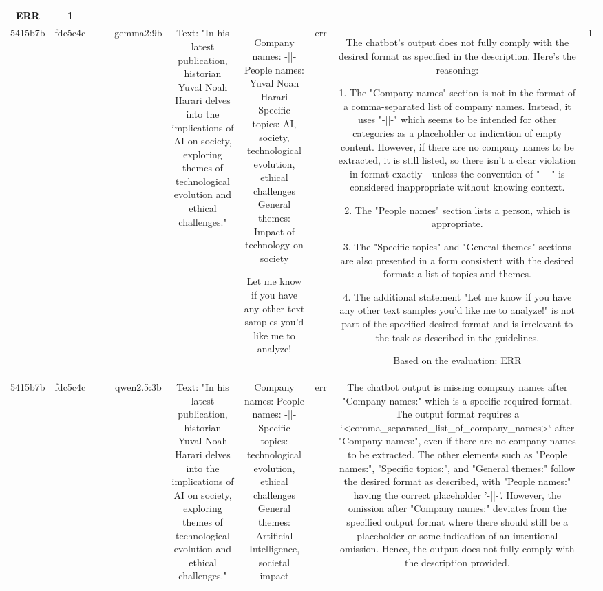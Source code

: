 \begin{table}[h!]
\begin{tabular}{|c|c|c|c|c|c|c|c|c|c|}
ERR & 1\\
\hline
5415b7b & fdc5c4c &  &  & gemma2:9b & Text: "In his latest publication, historian Yuval Noah Harari delves into the implications of AI on society, exploring themes of technological evolution and ethical challenges." & Company names: -||-
People names: Yuval Noah Harari
Specific topics: AI, society, technological evolution, ethical challenges
General themes: Impact of technology on society  




Let me know if you have any other text samples you'd like me to analyze! 
 & err & The chatbot's output does not fully comply with the desired format as specified in the description. Here's the reasoning:

1. The "Company names" section is not in the format of a comma-separated list of company names. Instead, it uses "-||-" which seems to be intended for other categories as a placeholder or indication of empty content. However, if there are no company names to be extracted, it is still listed, so there isn't a clear violation in format exactly—unless the convention of "-||-" is considered inappropriate without knowing context.

2. The "People names" section lists a person, which is appropriate.

3. The "Specific topics" and "General themes" sections are also presented in a form consistent with the desired format: a list of topics and themes.

4. The additional statement "Let me know if you have any other text samples you'd like me to analyze!" is not part of the specified desired format and is irrelevant to the task as described in the guidelines.

Based on the evaluation:
ERR & 1\\
\hline
5415b7b & fdc5c4c &  &  & qwen2.5:3b & Text: "In his latest publication, historian Yuval Noah Harari delves into the implications of AI on society, exploring themes of technological evolution and ethical challenges." & Company names: 
People names: -||-
Specific topics: technological evolution, ethical challenges
General themes: Artificial Intelligence, societal impact & err & The chatbot output is missing company names after "Company names:" which is a specific required format. The output format requires a `<comma_separated_list_of_company_names>` after "Company names:", even if there are no company names to be extracted. The other elements such as "People names:", "Specific topics:", and "General themes:" follow the desired format as described, with "People names:" having the correct placeholder '-||-'. However, the omission after "Company names:" deviates from the specified output format where there should still be a placeholder or some indication of an intentional omission. Hence, the output does not fully comply with the description provided.


\end{tabular}
\end{table}

